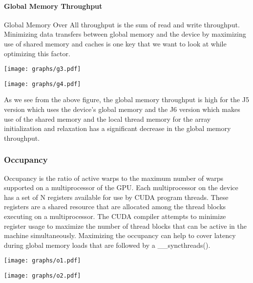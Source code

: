 \documentclass[10pt]{article}
\makeatletter
\newenvironment{figurehere}
{\def\@captype{figure}}
{}
\makeatother
\begin{document}
\begin{multicols}{2}
  \paragraph{Global Memory Throughput}
  Global Memory Over All throughput is the sum of read and write throughput.
  Minimizing data transfers between global memory and the device by maximizing use of shared memory and caches is one key that we want to look at while optimizing this factor.

  \begin{figurehere}
    \centering
    \texttt{[image: graphs/g3.pdf]}
    \caption{}
    \label{fig:jacobi_mem_throughput}
  \end{figurehere}
  \begin{figurehere}
    \centering
    \texttt{[image: graphs/g4.pdf]}
    \caption{}
    \label{fig:reduction_mem_throughput}
  \end{figurehere}
  As we see from the above figure, the global memory throughput is high for the J5 version which uses the device’s global memory and the J6 version which makes use of the shared memory and the local thread memory for the array initialization and relaxation has a significant decrease in the global memory throughput.
  \subsubsection{Occupancy}
  Occupancy is the ratio of active warps to the maximum number of warps supported on a multiprocessor of the GPU.
  Each multiprocessor on the device has a set of N registers available for use by CUDA program threads.
  These registers are a  shared resource that are allocated among the thread blocks executing on a multiprocessor.
  The CUDA compiler attempts to minimize register usage to maximize the number of thread blocks that can be active in the machine simultaneously.
  Maximizing the occupancy can help to cover latency during global memory loads that are followed by a \_\_syncthreads(). 

  \begin{figurehere}
    \centering
    \texttt{[image: graphs/o1.pdf]}
    \caption{}
    \label{fig:1k_occupancy}
  \end{figurehere}

  \begin{figurehere}
    \centering
    \texttt{[image: graphs/o2.pdf]}
    \caption{}
    \label{fig:2k_occupancy}
  \end{figurehere}


\end{multicols}
\end{document}
